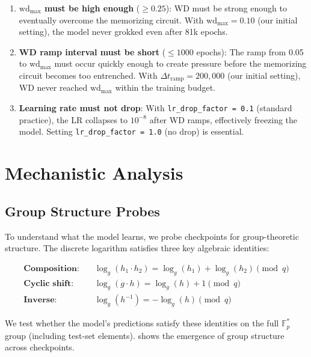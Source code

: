 \documentclass[11pt]{article}
\newcommand{\Fps}{\mathbb{F}_p^*}
\newcommand{\wdmax}{\mathrm{wd}_{\max}}
\begin{document}
\begin{enumerate}[leftmargin=*]
    \item \textbf{$\wdmax$ must be high enough} ($\geq 0.25$): WD must be strong enough to eventually overcome the memorizing circuit. With $\wdmax = 0.10$ (our initial setting), the model never grokked even after 81k epochs.
    \item \textbf{WD ramp interval must be short} ($\leq 1000$ epochs): The ramp from 0.05 to $\wdmax$ must occur quickly enough to create pressure before the memorizing circuit becomes too entrenched. With $\Delta t_{\mathrm{ramp}} = 200{,}000$ (our initial setting), WD never reached $\wdmax$ within the training budget.
    \item \textbf{Learning rate must not drop}: With \texttt{lr\_drop\_factor = 0.1} (standard practice), the LR collapses to $10^{-8}$ after WD ramps, effectively freezing the model. Setting \texttt{lr\_drop\_factor = 1.0} (no drop) is essential.
\end{enumerate}



\section{Mechanistic Analysis}
\label{sec:mechanistic}

\subsection{Group Structure Probes}

To understand what the model learns, we probe checkpoints for group-theoretic structure. The discrete logarithm satisfies three key algebraic identities:

\begin{align}
    \textbf{Composition:} \quad & \log_g(h_1 \cdot h_2) = \log_g(h_1) + \log_g(h_2) \pmod{q} \\
    \textbf{Cyclic shift:} \quad & \log_g(g \cdot h) = \log_g(h) + 1 \pmod{q} \\
    \textbf{Inverse:} \quad & \log_g(h^{-1}) = -\log_g(h) \pmod{q}
\end{align}

We test whether the model's predictions satisfy these identities on the full $\Fps$ group (including test-set elements).  shows the emergence of group structure across checkpoints.
\end{document}
